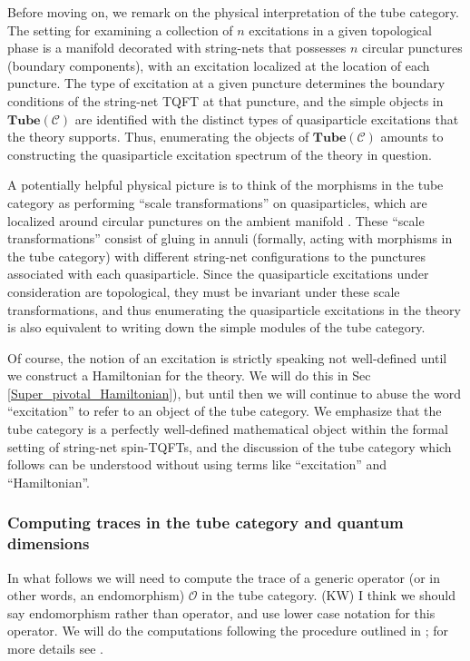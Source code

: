 \documentclass[12pt,a4paper]{article}
\newcommand{\mcc}{\mathcal{C}}
\newcommand{\mco}{\mathcal{O}}
\newcommand{\tube}{\textbf{Tube}}
\newcommand{\kw}[1]{{\color{kwcolor}\footnotesize{(KW) #1}}}
\begin{document}
Before moving on, we remark on the physical interpretation of the tube category. 
The setting for examining a collection of $n$ excitations in a given topological phase is a 
manifold decorated with string-nets that possesses $n$ circular punctures (boundary components), with an excitation localized at the location of each puncture.
The type of excitation at a given puncture determines the boundary conditions of the string-net TQFT at that puncture, 
and the simple objects in $\tube(\mcc)$ are identified with the distinct types of quasiparticle excitations that the theory supports. 
Thus, enumerating the objects of $\tube(\mcc)$ amounts to constructing the quasiparticle excitation spectrum of the theory in question. 

A potentially helpful physical picture is to think of the morphisms in the tube category as performing ``scale transformations'' 
on quasiparticles, which are localized around circular punctures on the ambient manifold \cite{lan2014}. 
These ``scale transformations'' consist of gluing in annuli (formally, acting with morphisms in the tube category) with different string-net configurations to the 
punctures associated with each quasiparticle. 
Since the quasiparticle excitations under consideration are topological, they must be invariant under these scale transformations, 
and thus enumerating the quasiparticle excitations in the theory is also equivalent to writing down the simple 
modules of the tube category. 

Of course, the notion of an excitation is strictly speaking not well-defined until we construct a Hamiltonian for the theory.
We will do this in Sec \ref{Super_pivotal_Hamiltonian}), but until then we will continue to abuse the word ``excitation''
to refer to an object of the tube category. 
We emphasize that the tube category is a perfectly well-defined mathematical object within 
the formal setting of string-net spin-TQFTs, and the discussion of the tube category 
which follows can be understood without using terms like ``excitation'' and ``Hamiltonian''. 






\subsubsection{Computing traces in the tube category and quantum dimensions} \label{qdims_and_traces}


In what follows we will need to compute the trace of a generic operator (or in other words, an endomorphism) $\mco$ in the tube category. 
\kw{I think we should say endomorphism rather than operator, and use lower case notation for this operator.}
We will do the computations following the procedure outlined in \cite{Walker2006}; for more details see \cite{ghosh2016,das2014}.
\end{document}
